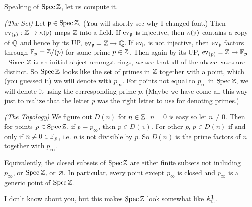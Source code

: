 \begin{eg}[$\spec \Z$]
  Speaking of $\spec \Z$, let us compute it. 

  \textit{(The Set)}
  Let $\mathfrak{p} \in \operatorname{Spec}\mathbb{Z}$.
  (You will shortly see why I changed font.)
  Then $\operatorname{ev}_{\mathfrak{(}p)} : \mathbb{Z} \to \kappa(\mathfrak{p})$ maps $\mathbb{Z}$ into a field.
  If $\operatorname{ev}_{\mathfrak{p}}$ is injective, then $\kappa(\mathfrak{p})$ contains a copy of $\mathbb{Q}$
  and hence by its UP, $\operatorname{ev}_{\mathfrak{p}} = \mathbb{Z} \to \mathbb{Q}$.
  If $\operatorname{ev}_{\mathfrak{p}}$ is not injective,
  then $\operatorname{ev}_{\mathfrak{p}}$ factors through $\mathbb{F}_p = \mathbb{Z}/(p)$ for some prime $p \in \mathbb{Z}$.
  Then again by its UP, $\operatorname{ev}_{\mathfrak{(}p)} = \mathbb{Z} \to \mathbb{F}_p$.
  Since $\mathbb{Z}$ is an initial object amongst rings,
  we see that all of the above cases are distinct.
  So $\spec \Z$ looks like the set of primes in $\mathbb{Z}$ together with
  a point, which (you guessed it) we will denote with $p_\infty$.
  For points not equal to $p_\infty$ in $\spec \Z$,
  we will denote it using the corresponding prime $p$.
  (Maybe we have come all this way just to realize that 
  the letter $p$ was the right letter to use for denoting primes.)

  \textit{(The Topology)}
  We figure out $D(n)$ for $n \in \mathbb{Z}$.
  $n = 0$ is easy so let $n \neq 0$.
  Then for points $p \in \operatorname{Spec} \mathbb{Z}$,
  if $p = p_\infty$, then $p \in D(n)$.
  For other $p$, 
  $p \in D(n)$ if and only if $n \neq 0 \in \mathbb{F}_p$,
  i.e. $n$ is not divisible by $p$.
  So $D(n)$ is the prime factors of $n$ together with $p_\infty$.

  Equivalently, the closed subsets of $\spec\Z$
  are either finite subsets not including $p_\infty$, 
  or $\spec\Z$, or $\varnothing$.
  In particular, every point except $p_\infty$ is closed and 
  $p_\infty$ is a generic point of $\spec \Z$. 
  
  I don't know about you,
  but this makes $\spec \Z$ look somewhat like $\mathbb{A}^1_{\mathbb{C}}$.
\end{eg}

